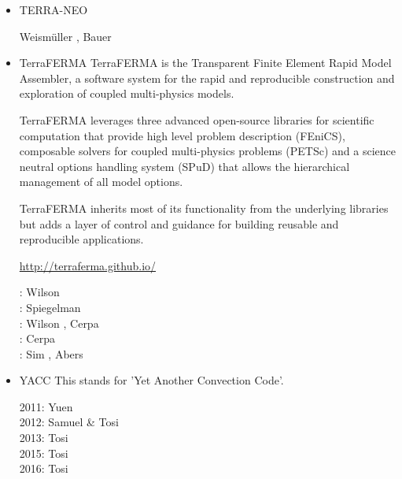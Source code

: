 \begin{itemize}
\item {\codefont TERRA-NEO} 

\begin{scriptsize}
Weism{\"u}ller \etal \cite{wegg15},
Bauer \etal \cite{babd20}
\end{scriptsize}


\item {\codefont TerraFERMA} 
TerraFERMA is the Transparent Finite Element Rapid Model Assembler, a software system for the rapid and reproducible construction and exploration of coupled multi-physics models.

TerraFERMA leverages three advanced open-source libraries for scientific computation that provide high level problem description (FEniCS), composable solvers for coupled multi-physics problems (PETSc) and a science neutral options handling system (SPuD) that allows the hierarchical management of all model options.

TerraFERMA inherits most of its functionality from the underlying libraries but adds a layer of control and guidance for building reusable and reproducible applications.

\url{http://terraferma.github.io/}

\begin{scriptsize}
\twothousandfourteen: Wilson \etal \cite{wisv14}\\
\twothousandsixteen: Spiegelman \cite{spmw16}\\
\twothousandseventeen: Wilson \etal \cite{wisv17}, Cerpa \etal \cite{ceww17}\\
\twothousandnineteen: Cerpa \etal \cite{ceww19}\\
\twothousandtwenty: Sim \etal \cite{siss20}, Abers \etal \cite{abvw20}
\end{scriptsize}

\item {\codefont YACC} 
This stands for 'Yet Another Convection Code'.

\begin{scriptsize}
2011: Yuen \etal \cite{yutc11}\\
2012: Samuel \& Tosi \cite{sato12}\\
2013: Tosi \etal \cite{toyd13}\\
2015: Tosi \etal \cite{tosn15}\\
2016: Tosi \etal \cite{tomy16}
\end{scriptsize}


\end{itemize}
